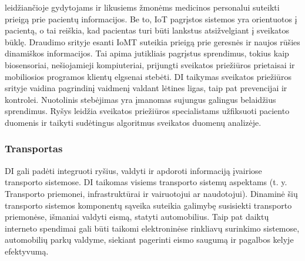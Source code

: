 \documentclass{VUMIFInfBakalaurinis}
\begin{document}
leidžiančioje gydytojams ir likusiems žmonėms medicinos personalui suteikti prieigą prie pacientų informacijos. Be to, IoT pagrįstos sistemos yra orientuotos į pacientą, o tai reiškia, kad pacientas turi būti lankstus atsižvelgiant į sveikatos būklę.
Draudimo srityje esanti IoMT suteikia prieigą prie geresnės ir naujos rūšies dinamiškos informacijos. Tai apima jutikliais pagrįstus sprendimus, tokius kaip biosensoriai, nešiojamieji kompiuteriai, prijungti sveikatos priežiūros prietaisai
ir mobiliosios programos klientų elgsenai stebėti. DI taikymas sveikatos priežiūros srityje vaidina pagrindinį vaidmenį valdant lėtines ligas, taip pat prevencijai ir kontrolei.
Nuotolinis stebėjimas yra įmanomas sujungus galingus belaidžius sprendimus. Ryšys leidžia sveikatos priežiūros specialistams užfiksuoti paciento duomenis ir taikyti sudėtingus algoritmus sveikatos duomenų analizėje.
\cite{IOTWiki}

\subsubsection{Transportas}
DI gali padėti integruoti ryšius, valdyti ir apdoroti informaciją įvairiose transporto sistemose.
DI taikomas visiems transporto sistemų aspektams (t. y. Transporto priemonei, infrastruktūrai ir vairuotojui ar naudotojui). Dinaminė šių transporto sistemos komponentų sąveika suteikia galimybę susisiekti transporto priemonėse, 
išmaniai valdyti eismą, statyti automobilius. Taip pat daiktų interneto spendimai gali būti taikomi elektroninėse rinkliavų surinkimo sistemose, automobilių parkų valdyme, siekiant pagerinti eismo saugumą ir pagalbos kelyje efektyvumą.

%
\end{document}
